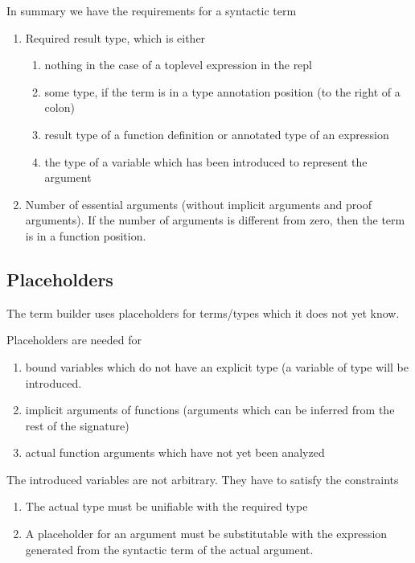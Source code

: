 \noindent In summary we have the requirements for a syntactic term
%
\begin{enumerate}

\item Required result type, which is either
  \begin{enumerate}

  \item nothing in the case of a toplevel expression in the repl

  \item some type, if the term is in a type annotation position (to the right
    of a colon)

  \item result type of a function definition or annotated type of an expression

  \item the type of a variable which has been introduced to represent the
    argument
  \end{enumerate}


\item Number of essential arguments (without implicit arguments and proof
  arguments). If the number of arguments is different from zero, then the term
  is in a function position.
\end{enumerate}





\subsection{Placeholders}

The term builder uses placeholders for terms/types which it does not yet know.

Placeholders are needed for
%
\begin{enumerate}

\item bound variables which do not have an explicit type (a variable of type
   will be introduced.


\item implicit arguments of functions (arguments which can be inferred from
  the rest of the signature)

\item actual function arguments which have not yet been analyzed

\end{enumerate}

The introduced variables are not arbitrary. They have to satisfy the
constraints
\begin{enumerate}
\item The actual type must be unifiable with the required type
\item A placeholder for an argument must be substitutable with the expression
  generated from the syntactic term of the actual argument.
\end{enumerate}

